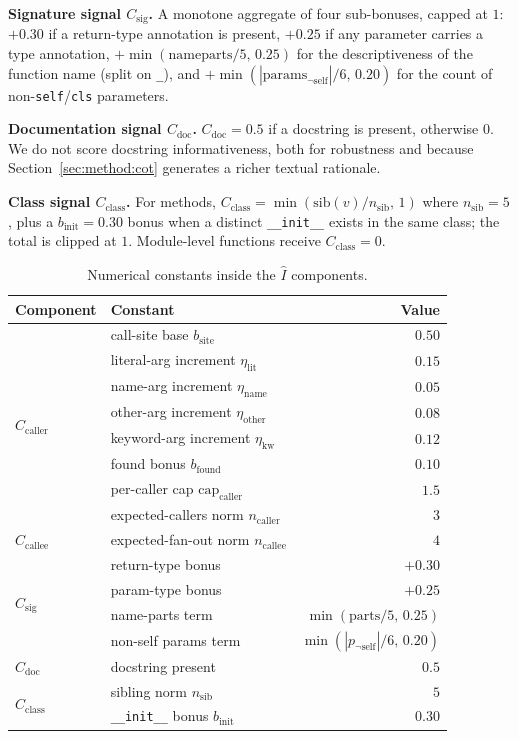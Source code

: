 \textbf{Signature signal $C_{\mathrm{sig}}$.}
A monotone aggregate of four sub-bonuses, capped at $1$:
$+0.30$ if a return-type annotation is present, $+0.25$ if any parameter
carries a type annotation, $+\min(\mathrm{nameparts}/5,\,0.25)$ for the
descriptiveness of the function name (split on \texttt{\_}), and
$+\min(|\mathrm{params}_{\neg\mathrm{self}}|/6,\,0.20)$ for the count of
non-\texttt{self}/\texttt{cls} parameters.

\textbf{Documentation signal $C_{\mathrm{doc}}$.}
$C_{\mathrm{doc}}=0.5$ if a docstring is present, otherwise $0$. We do
not score docstring informativeness, both for robustness and because
Section~\ref{sec:method:cot} generates a richer textual rationale.

\textbf{Class signal $C_{\mathrm{class}}$.}
For methods, $C_{\mathrm{class}}=\min(\mathrm{sib}(v)/n_{\mathrm{sib}},\,1)$
where $n_{\mathrm{sib}}=5$, plus a $b_{\mathrm{init}}=0.30$ bonus when a
distinct \texttt{\_\_init\_\_} exists in the same class; the total is
clipped at $1$. Module-level functions receive $C_{\mathrm{class}}=0$.

\begin{table}[h]
\centering\small
\caption{Numerical constants inside the $\hat{I}$ components.}
\label{tab:inf-constants}
\begin{tabular}{llr}
\toprule
Component & Constant & Value \\
\midrule
\multirow{8}{*}{$C_{\mathrm{caller}}$}
  & call-site base $b_{\mathrm{site}}$              & $0.50$ \\
  & literal-arg increment $\eta_{\mathrm{lit}}$     & $0.15$ \\
  & name-arg increment $\eta_{\mathrm{name}}$       & $0.05$ \\
  & other-arg increment $\eta_{\mathrm{other}}$     & $0.08$ \\
  & keyword-arg increment $\eta_{\mathrm{kw}}$      & $0.12$ \\
  & found bonus $b_{\mathrm{found}}$                & $0.10$ \\
  & per-caller cap $\mathrm{cap}_{\mathrm{caller}}$ & $1.5$ \\
  & expected-callers norm $n_{\mathrm{caller}}$     & $3$ \\
\midrule
$C_{\mathrm{callee}}$ & expected-fan-out norm $n_{\mathrm{callee}}$ & $4$ \\
\midrule
\multirow{4}{*}{$C_{\mathrm{sig}}$}
  & return-type bonus       & $+0.30$ \\
  & param-type bonus        & $+0.25$ \\
  & name-parts term         & $\min(\mathrm{parts}/5,\,0.25)$ \\
  & non-self params term    & $\min(|p_{\neg\mathrm{self}}|/6,\,0.20)$ \\
\midrule
$C_{\mathrm{doc}}$    & docstring present & $0.5$ \\
\midrule
\multirow{2}{*}{$C_{\mathrm{class}}$}
  & sibling norm $n_{\mathrm{sib}}$           & $5$ \\
  & \texttt{\_\_init\_\_} bonus $b_{\mathrm{init}}$ & $0.30$ \\
\bottomrule
\end{tabular}
\end{table}

